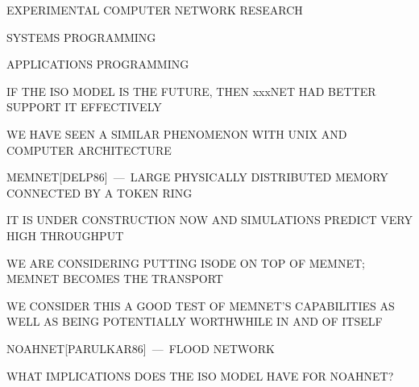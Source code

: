 \begin{bwslide}

\begin{nrtc}
\item	EXPERIMENTAL COMPUTER NETWORK RESEARCH

\item	SYSTEMS PROGRAMMING

\item	APPLICATIONS PROGRAMMING
\end{nrtc}
\end{bwslide}


\begin{bwslide}

\begin{nrtc}
\item	IF THE ISO MODEL IS THE FUTURE,
	THEN xxxNET HAD BETTER SUPPORT IT EFFECTIVELY

\item	WE HAVE SEEN A SIMILAR PHENOMENON WITH UNIX AND COMPUTER ARCHITECTURE
\end{nrtc}
\end{bwslide}

\begin{bwslide}

\begin{nrtc}
\item	MEMNET[DELP86]~---~LARGE PHYSICALLY DISTRIBUTED MEMORY CONNECTED BY A
	TOKEN RING
    \begin{nrtc}
    \item	IT IS UNDER CONSTRUCTION NOW AND SIMULATIONS PREDICT VERY HIGH
		THROUGHPUT

    \item	WE ARE CONSIDERING PUTTING ISODE ON TOP OF MEMNET;
		MEMNET BECOMES THE TRANSPORT

    \item	WE CONSIDER THIS A GOOD TEST OF MEMNET'S CAPABILITIES AS WELL
		AS BEING POTENTIALLY WORTHWHILE IN AND OF ITSELF
    \end{nrtc}

\item	NOAHNET[PARULKAR86]~---~FLOOD NETWORK
    \begin{nrtc}
    \item	WHAT IMPLICATIONS DOES THE ISO MODEL HAVE FOR NOAHNET?
    \end{nrtc}
\end{nrtc}
\end{bwslide}


